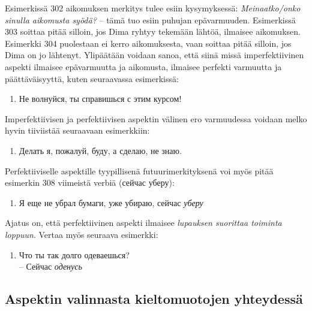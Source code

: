 \documentclass[]{scrartcl}
\providecommand{\tightlist}{%
  \setlength{\itemsep}{0pt}\setlength{\parskip}{0pt}}
\begin{document}
Esimerkissä 302 aikomuksen merkitys tulee esiin kysymyksessä:
\emph{Meinaatko/onko sinulla aikomusta syödä?} -- tämä tuo esiin puhujan
epävarmuuden. Esimerkissä 303 soittaa pitää silloin, jos Dima ryhtyy
tekemään lähtöä, ilmaisee aikomuksen. Esimerkki 304 puolestaan ei kerro
aikomuksesta, vaan soittaa pitää silloin, jos Dima on jo lähtenyt.
Ylipäätään voidaan sanoa, että siinä missä imperfektiivinen aspekti
ilmaisee epävarmuutta ja aikomusta, ilmaisee perfekti varmuutta ja
päättäväisyyttä, kuten seuraavassa esimerkissä:

\begin{enumerate}
\def\labelenumi{(\arabic{enumi})}
\setcounter{enumi}{304}
\tightlist
\item
  Не волнуйся, ты справишься с этим курсом!
\end{enumerate}

Imperfektiivisen ja perfektiivisen aspektin välinen ero varmuudessa
voidaan melko hyvin tiiviistää seuraavaan esimerkkiin:

\begin{enumerate}
\def\labelenumi{(\arabic{enumi})}
\setcounter{enumi}{305}
\tightlist
\item
  Делать я, пожалуй, буду, а сделаю, не знаю.
\end{enumerate}

Perfektiiviselle aspektille tyypillisenä futuurimerkityksenä voi myös
pitää esimerkin 308 viimeistä verbiä (сейчас уберу):

\begin{enumerate}
\def\labelenumi{(\arabic{enumi})}
\setcounter{enumi}{306}
\tightlist
\item
  Я еще не убрал бумаги, уже убираю, сейчас \emph{уберу}
\end{enumerate}

Ajatus on, että perfektiivinen aspekti ilmaisee \emph{lupauksen
suorittaa toiminta loppuun}. Vertaa myös seuraava esimerkki:

\begin{enumerate}
\def\labelenumi{(\arabic{enumi})}
\setcounter{enumi}{307}
\tightlist
\item
  Что ты так долго одеваешься?\\
   -- Сейчас \emph{оденусь}
\end{enumerate}

\subsection{Aspektin valinnasta kieltomuotojen
yhteydessä}\label{aspektin-valinnasta-kieltomuotojen-yhteydessuxe4}
\end{document}
